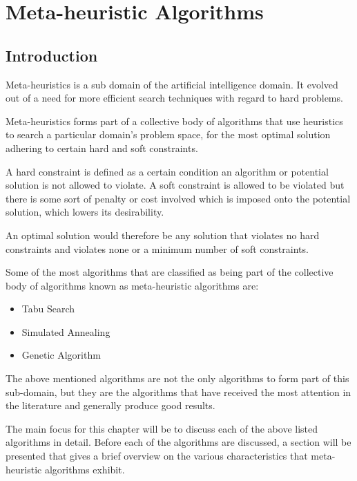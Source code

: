 \chapter{Meta-heuristic Algorithms}
\label{ch:metaheuristic}
\section{Introduction}
Meta-heuristics is a sub domain of the artificial intelligence domain. It evolved out of a need for more efficient search techniques with regard to hard problems. 

Meta-heuristics forms part of a collective body of algorithms that use heuristics to search a particular domain's problem space, for the most optimal solution adhering to certain hard and soft constraints\cite{AIModernApproach,NatureInspiredMetaHeuristic}. 

A hard constraint is defined as a certain condition an algorithm or potential solution is not allowed to violate\cite{AIModernApproach,NatureInspiredMetaHeuristic,Karen2004,Eisenblatter}. A soft constraint is allowed to be violated but there is some sort of penalty or cost involved which is imposed onto the potential solution, which lowers its desirability\cite{AIModernApproach,NatureInspiredMetaHeuristic,Karen2004,Eisenblatter}. 

An optimal solution would therefore be any solution that violates no hard constraints and violates none or a minimum number of soft constraints\cite{AIModernApproach,NatureInspiredMetaHeuristic,Karen2004,Eisenblatter}.

Some of the most algorithms that are classified as being part of the collective body of algorithms known as meta-heuristic algorithms are:
\begin{itemize}
\item Tabu Search
\item Simulated Annealing
\item Genetic Algorithm
\end{itemize}
The above mentioned algorithms are not the only algorithms to form part of this sub-domain, but they are the algorithms that have received the most attention in the literature and generally produce good results\cite{SweepMeta}.

The main focus for this chapter will be to discuss each of the above listed algorithms in detail. Before each of the algorithms are discussed, a section will be presented that gives a brief overview on the various characteristics that meta-heuristic algorithms exhibit. 

